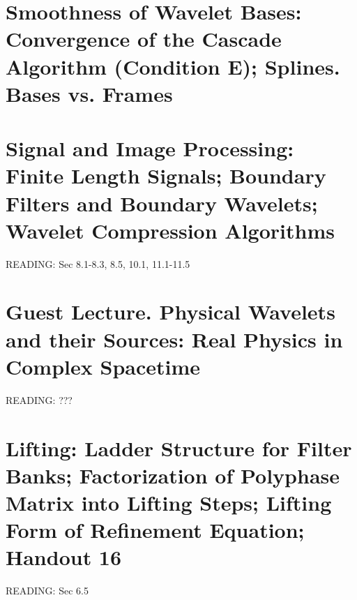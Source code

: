 \documentclass[twoside]{amsart}
\theoremstyle{plain}
\theoremstyle{definition}
\theoremstyle{remark}
\numberwithin{equation}{section}
\begin{document}
\section{Smoothness of Wavelet Bases: Convergence of the Cascade Algorithm (Condition E); Splines. Bases vs. Frames}

\section{Signal and Image Processing: Finite Length Signals; Boundary Filters and Boundary Wavelets; Wavelet Compression Algorithms}

READING: Sec 8.1-8.3, 8.5, 10.1, 11.1-11.5  \cite{GStrangTNguyen1996}

\section{Guest Lecture. Physical Wavelets and their Sources: Real Physics in Complex Spacetime}

READING: ???

\section{Lifting: Ladder Structure for Filter Banks; Factorization of Polyphase Matrix into Lifting Steps; Lifting Form of Refinement Equation; Handout 16}

READING: Sec 6.5 \cite{GStrangTNguyen1996}
\end{document}

